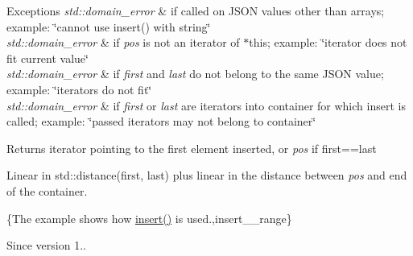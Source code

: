 \begin{DoxyExceptions}{Exceptions}
{\em std\+::domain\+\_\+error} & if called on J\+S\+ON values other than arrays; example\+: {\ttfamily \char`\"{}cannot use insert() with string\char`\"{}} \\
\hline
{\em std\+::domain\+\_\+error} & if {\itshape pos} is not an iterator of $\ast$this; example\+: {\ttfamily \char`\"{}iterator does not fit current value\char`\"{}} \\
\hline
{\em std\+::domain\+\_\+error} & if {\itshape first} and {\itshape last} do not belong to the same J\+S\+ON value; example\+: {\ttfamily \char`\"{}iterators do not fit\char`\"{}} \\
\hline
{\em std\+::domain\+\_\+error} & if {\itshape first} or {\itshape last} are iterators into container for which insert is called; example\+: {\ttfamily \char`\"{}passed iterators may not
belong to container\char`\"{}}\\
\hline
\end{DoxyExceptions}
\begin{DoxyReturn}{Returns}
iterator pointing to the first element inserted, or {\itshape pos} if {\ttfamily first==last}
\end{DoxyReturn}
Linear in {\ttfamily std\+::distance(first, last)} plus linear in the distance between {\itshape pos} and end of the container.

\{The example shows how {\ttfamily \hyperlink{a00025_a7f7bbb3a9efef2e2442f538a24c1c47b}{insert()}} is used.,insert\+\_\+\+\_\+range\}

\begin{DoxySince}{Since}
version 1.. 
\end{DoxySince}
